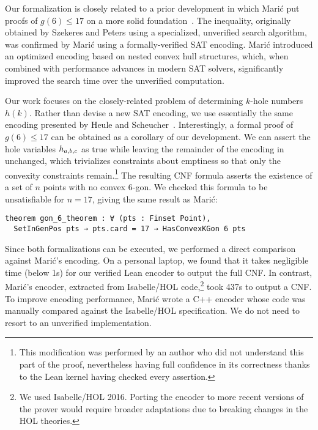 Our formalization is closely related to a prior development
in which Marić put proofs of $g(6) \leq 17$ on a more solid foundation~\cite{19maric_fast_formal_proof_erdos_szekeres_conjecture_convex_polygons_most_six_points}.
The inequality,
originally obtained by Szekeres and Peters \cite{06szekeres_computer_solution_17_point_erdos_szekeres_problem}
using a specialized, unverified search algorithm,
was confirmed by Marić using a formally-verified SAT encoding.
Marić introduced an optimized encoding based on nested convex hull structures,
which, when combined with performance advances in modern SAT solvers,
significantly improved the search time over the unverified computation.

Our work focuses on the closely-related problem
of determining $k$-hole numbers $h(k)$.
Rather than devise a new SAT encoding,
we use essentially the same encoding presented by Heule and Scheucher~\cite{emptyHexagonNumber}.
Interestingly,
a formal proof of $g(6) \leq 17$ can be obtained
as a corollary of our development.
We can assert the hole variables $\hvar_{a,b,c}$ as true
while leaving the remainder of the encoding in~ unchanged,
which trivializes constraints about emptiness
so that only the convexity constraints remain.\footnote{
This modification was performed by an author
who did not understand this part of the proof,
nevertheless having full confidence in its correctness
thanks to the Lean kernel having checked every assertion.}
The resulting CNF formula
asserts the existence of a set of $n$ points
with no convex $6$-gon.
We checked this formula to be unsatisfiable for $n = 17$,
giving the same result as Marić:
\begin{lstlisting}
theorem gon_6_theorem : ∀ (pts : Finset Point),
  SetInGenPos pts → pts.card = 17 → HasConvexKGon 6 pts
\end{lstlisting}

Since both formalizations can be executed,
we performed a direct comparison against Marić's encoding.
On a personal laptop,
we found that it takes negligible time (below 1s)
for our verified Lean encoder to output the full CNF.
In contrast,
Marić's encoder, extracted from Isabelle/HOL code,\footnote{
  We used Isabelle/HOL 2016.
  Porting the encoder to more recent versions of the prover
  would require broader adaptations
  due to breaking changes in the HOL theories.}
took 437s to output a CNF.
To improve encoding performance,
Marić wrote a C++ encoder
whose code was manually compared against the Isabelle/HOL specification.
We do not need to resort to an unverified implementation.

